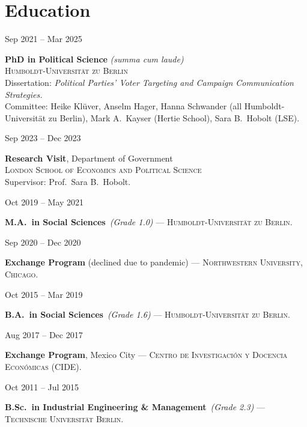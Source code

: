 \documentclass[11pt,a4paper]{article}
\newlength{\cvleftw}\setlength{\cvleftw}{0.20\textwidth}
\newlength{\cvrightw}\setlength{\cvrightw}{0.76\textwidth}
\newlength{\cvgap}\setlength{\cvgap}{0.02\textwidth}
\newenvironment{cventries}{\par\setlength{\parskip}{0pt}}{\par}
\newcommand{\cvitem}[2]{%
  \par\nopagebreak[2]%
  \noindent
  \begin{minipage}[t]{\cvleftw}\raggedright\color{cvmuted}\small\vspace{0pt}\strut #1\end{minipage}%
  \hspace{\cvgap}%
  \begin{minipage}[t]{\cvrightw}\raggedright\vspace{0pt}\strut #2\end{minipage}%
  \par\vspace{10pt plus 3pt minus 2pt}%
}
\newcommand{\cvtitle}[1]{\textbf{#1}}
\newcommand{\cvinst}[1]{\textsc{\small #1}}    %
\begin{document}
\section*{Education}
\begin{cventries}
\cvitem{Sep 2021 -- Mar 2025}{%
  \cvtitle{PhD in Political Science} \emph{(summa cum laude)} \\
  \cvinst{Humboldt-Universit\"at zu Berlin} \\
  Dissertation: \emph{Political Parties' Voter Targeting and Campaign Communication Strategies.} \\
  Committee: Heike Kl\"uver, Anselm Hager, Hanna Schwander (all Humboldt-Universit\"at zu Berlin),
  Mark A.\ Kayser (Hertie School), Sara B.\ Hobolt (LSE).}
\cvitem{Sep 2023 -- Dec 2023}{%
  \cvtitle{Research Visit}, Department of Government \\
  \cvinst{London School of Economics and Political Science} \\
  Supervisor: Prof.\ Sara B.\ Hobolt.}
\cvitem{Oct 2019 -- May 2021}{%
  \cvtitle{M.A.\ in Social Sciences} \,\emph{(Grade 1.0)} ---
  \cvinst{Humboldt-Universit\"at zu Berlin}.}
\cvitem{Sep 2020 -- Dec 2020}{%
  \cvtitle{Exchange Program} (declined due to pandemic) ---
  \cvinst{Northwestern University, Chicago}.}
\cvitem{Oct 2015 -- Mar 2019}{%
  \cvtitle{B.A.\ in Social Sciences} \,\emph{(Grade 1.6)} ---
  \cvinst{Humboldt-Universit\"at zu Berlin}.}
\cvitem{Aug 2017 -- Dec 2017}{%
  \cvtitle{Exchange Program}, Mexico City ---
  \cvinst{Centro de Investigaci\'on y Docencia Econ\'omicas (CIDE)}.}
\cvitem{Oct 2011 -- Jul 2015}{%
  \cvtitle{B.Sc.\ in Industrial Engineering \& Management} \,\emph{(Grade 2.3)} ---
  \cvinst{Technische Universit\"at Berlin}.}
\end{cventries}

\end{document}

